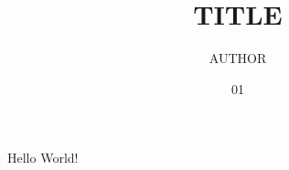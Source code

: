 \documentclass{notes}
\title{TITLE}
\author{AUTHOR}
\date{01}{09}{2016}
\begin{document}
Hello World!
\end{document}
